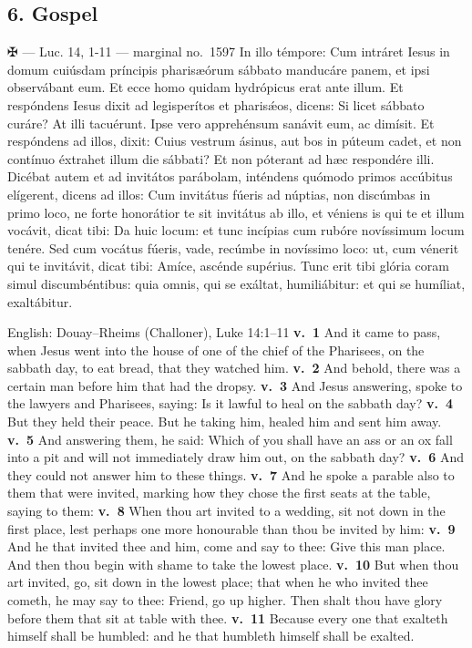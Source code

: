 \elementguard
\subsection*{6. Gospel }

\begin{appointedlatin}{✠  --- Luc. 14, 1-11 --- marginal no.\ 1597}
In illo témpore: Cum intráret Iesus in domum cuiúsdam príncipis pharisæórum
sábbato manducáre panem, et ipsi observábant eum. Et ecce homo quidam
hydrópicus erat ante illum. Et respóndens Iesus dixit ad legisperítos et
pharisǽos, dicens: Si licet sábbato curáre? At illi tacuérunt. Ipse vero
apprehénsum sanávit eum, ac dimísit. Et respóndens ad illos, dixit: Cuius
vestrum ásinus, aut bos in púteum cadet, et non contínuo éxtrahet illum die
sábbati? Et non póterant ad hæc respondére illi. Dicébat autem et ad invitátos
parábolam, inténdens quómodo primos accúbitus elígerent, dicens ad illos: Cum
invitátus fúeris ad núptias, non discúmbas in primo loco, ne forte honorátior
te sit invitátus ab illo, et véniens is qui te et illum vocávit, dicat tibi: Da
huic locum: et tunc incípias cum rubóre novíssimum locum tenére. Sed cum
vocátus fúeris, vade, recúmbe in novíssimo loco: ut, cum vénerit qui te
invitávit, dicat tibi: Amíce, ascénde supérius. Tunc erit tibi glória coram
simul discumbéntibus: quia omnis, qui se exáltat, humiliábitur: et qui se
humíliat, exaltábitur.
\end{appointedlatin}

\begin{namedtranslation}{English: Douay--Rheims (Challoner), Luke 14:1--11}
\textbf{v.~1} And it came to pass, when Jesus went into the house of one of the
chief of the Pharisees, on the sabbath day, to eat bread, that they watched him.
\textbf{v.~2} And behold, there was a certain man before him that had the
dropsy. \textbf{v.~3} And Jesus answering, spoke to the lawyers and Pharisees,
saying: Is it lawful to heal on the sabbath day? \textbf{v.~4} But they held
their peace. But he taking him, healed him and sent him away. \textbf{v.~5} And
answering them, he said: Which of you shall have an ass or an ox fall into a pit
and will not immediately draw him out, on the sabbath day? \textbf{v.~6} And
they could not answer him to these things. \textbf{v.~7} And he spoke a parable
also to them that were invited, marking how they chose the first seats at the
table, saying to them: \textbf{v.~8} When thou art invited to a wedding, sit not
down in the first place, lest perhaps one more honourable than thou be invited
by him: \textbf{v.~9} And he that invited thee and him, come and say to thee:
Give this man place. And then thou begin with shame to take the lowest place.
\textbf{v.~10} But when thou art invited, go, sit down in the lowest place; that
when he who invited thee cometh, he may say to thee: Friend, go up higher. Then
shalt thou have glory before them that sit at table with thee. \textbf{v.~11}
Because every one that exalteth himself shall be humbled: and he that humbleth
himself shall be exalted.
\end{namedtranslation}

